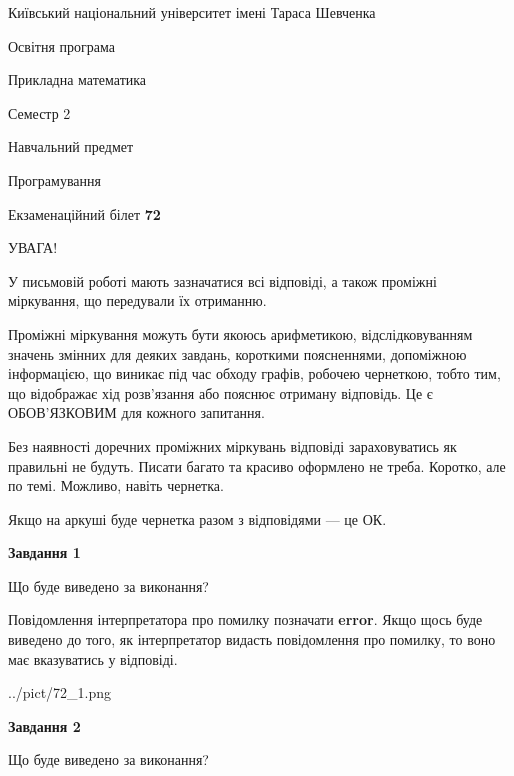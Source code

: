 \documentclass[12pt, ukrainian]{article}
\begin{document}
{{\begin {small}\par
{ \center  Київський національний університет імені Тараса Шевченка \par}
{\parbox {5 cm}{Освітня програма \hfill}{\parbox {7 cm}{Прикладна математика \hfill}}\parbox {6 cm}{\hfill Семестр 2}}\par
{\parbox {5 cm} {Навчальний предмет \hfill}\parbox {7 cm}{Програмування \hfill}\parbox {6cm}{\hfill}\par}\vspace{-7pt} \end{small}}{\center Екзаменаційний білет \No \textbf
{ 72 }\par}}
{
\begin {large}
УВАГА!

У письмовій роботі мають зазначатися всі відповіді, а також проміжні міркування, що передували їх отриманню.

Проміжні міркування можуть бути якоюсь арифметикою, відслідковуванням зна\-чень змінних для деяких завдань,
короткими поясненнями, допоміжною інформацією, що виникає під час обходу графів, робочею чернеткою,
тобто тим, що відображає хід розв’язання або пояснює отриману відповідь.
Це є ОБОВ’ЯЗКОВИМ для кожного запитання.

Без наявності доречних проміжних міркувань відповіді зараховуватись як правиль\-ні не будуть.
Писати багато та красиво оформлено не треба. Коротко, але по темі. Можли\-во, навіть чернетка.

Якщо на аркуші буде чернетка разом з відповідями --- це ОК.

\newpage

{\begin {center}\textbf{Завдання 1}\end {center}}\par
Що буде виведено за виконання?

Повідомлення інтерпретатора про помилку позначати \textbf{error}.
Якщо щось буде виведено до того, як інтерпретатор видасть повідомлення про помилку, 
то воно має вказуватись у відповіді. \par


\begin{center}
	{../pict/72_1.png}
\end{center}
\newpage

{\begin {center}\textbf{Завдання 2}\end {center}}\par
Що буде виведено за виконання?


\end{large}}
\end{document}
